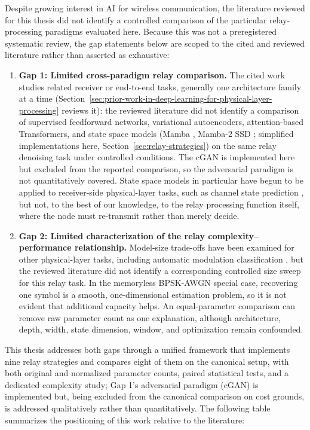 Despite growing interest in AI for wireless communication, the literature reviewed for this thesis did not identify a controlled comparison of the particular relay-processing paradigms evaluated here. Because this was not a preregistered systematic review, the gap statements below are scoped to the cited and reviewed literature rather than asserted as exhaustive:

\begin{enumerate}
    \item \textbf{Gap 1: Limited cross-paradigm relay comparison.} The cited work studies related receiver or end-to-end tasks, generally one architecture family at a time (Section~\ref{sec:prior-work-in-deep-learning-for-physical-layer-processing} reviews it): the reviewed literature did not identify a comparison of supervised feedforward networks, variational autoencoders, attention-based Transformers, and state space models (Mamba \cite{gu2023mamba}, Mamba-2 SSD \cite{DaoGu2024TransformersSSM}; simplified implementations here, Section~\ref{sec:relay-strategies}) on the same relay denoising task under controlled conditions. The cGAN is implemented here but excluded from the reported comparison, so the adversarial paradigm is not quantitatively covered. State space models in particular have begun to be applied to receiver-side physical-layer tasks, such as channel state prediction \cite{Djuhera2026MambaCSP}, but not, to the best of our knowledge, to the relay processing function itself, where the node must re-transmit rather than merely decide.
    \item \textbf{Gap 2: Limited characterization of the relay complexity--performance relationship.} Model-size trade-offs have been examined for other physical-layer tasks, including automatic modulation classification \cite{Harper2023AMCDeepNets}, but the reviewed literature did not identify a corresponding controlled size sweep for this relay task. In the memoryless BPSK-AWGN special case, recovering one symbol is a smooth, one-dimensional estimation problem, so it is not evident that additional capacity helps. An equal-parameter comparison can remove raw parameter count as one explanation, although architecture, depth, width, state dimension, window, and optimization remain confounded.

\end{enumerate}

This thesis addresses both gaps through a unified framework that implements nine relay strategies and compares eight of them on the canonical setup, with both original and normalized parameter counts, paired statistical tests, and a dedicated complexity study; Gap 1's adversarial paradigm (cGAN) is implemented but, being excluded from the canonical comparison on cost grounds, is addressed qualitatively rather than quantitatively. The following table summarizes the positioning of this work relative to the literature:

